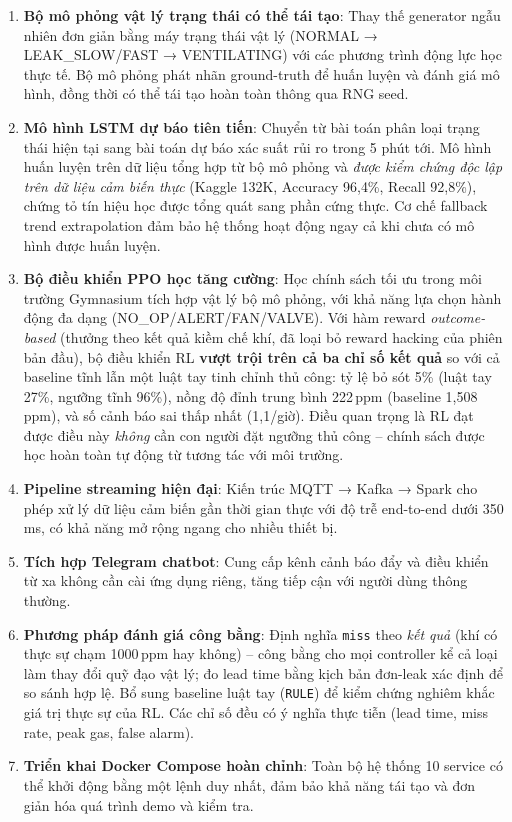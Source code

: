 \begin{enumerate}
  \item \textbf{Bộ mô phỏng vật lý trạng thái có thể tái tạo}: Thay thế generator ngẫu nhiên đơn giản bằng máy trạng thái vật lý (NORMAL → LEAK\_SLOW/FAST → VENTILATING) với các phương trình động lực học thực tế. Bộ mô phỏng phát nhãn ground-truth để huấn luyện và đánh giá mô hình, đồng thời có thể tái tạo hoàn toàn thông qua RNG seed.

  \item \textbf{Mô hình LSTM dự báo tiên tiến}: Chuyển từ bài toán phân loại trạng thái hiện tại sang bài toán dự báo xác suất rủi ro trong 5 phút tới. Mô hình huấn luyện trên dữ liệu tổng hợp từ bộ mô phỏng và \emph{được kiểm chứng độc lập trên dữ liệu cảm biến thực} (Kaggle 132K, Accuracy 96{,}4\%, Recall 92{,}8\%), chứng tỏ tín hiệu học được tổng quát sang phần cứng thực. Cơ chế fallback trend extrapolation đảm bảo hệ thống hoạt động ngay cả khi chưa có mô hình được huấn luyện.

  \item \textbf{Bộ điều khiển PPO học tăng cường}: Học chính sách tối ưu trong môi trường Gymnasium tích hợp vật lý bộ mô phỏng, với khả năng lựa chọn hành động đa dạng (NO\_OP/ALERT/FAN/VALVE). Với hàm reward \textit{outcome-based} (thưởng theo kết quả kiềm chế khí, đã loại bỏ reward hacking của phiên bản đầu), bộ điều khiển RL \textbf{vượt trội trên cả ba chỉ số kết quả} so với cả baseline tĩnh lẫn một luật tay tinh chỉnh thủ công: tỷ lệ bỏ sót 5\% (luật tay 27\%, ngưỡng tĩnh 96\%), nồng độ đỉnh trung bình 222\,ppm (baseline 1{,}508\,ppm), và số cảnh báo sai thấp nhất (1{,}1/giờ). Điều quan trọng là RL đạt được điều này \emph{không} cần con người đặt ngưỡng thủ công -- chính sách được học hoàn toàn tự động từ tương tác với môi trường.

  \item \textbf{Pipeline streaming hiện đại}: Kiến trúc MQTT → Kafka → Spark cho phép xử lý dữ liệu cảm biến gần thời gian thực với độ trễ end-to-end dưới 350 ms, có khả năng mở rộng ngang cho nhiều thiết bị.

  \item \textbf{Tích hợp Telegram chatbot}: Cung cấp kênh cảnh báo đẩy và điều khiển từ xa không cần cài ứng dụng riêng, tăng tiếp cận với người dùng thông thường.

  \item \textbf{Phương pháp đánh giá công bằng}: Định nghĩa \texttt{miss} theo \emph{kết quả} (khí có thực sự chạm 1000\,ppm hay không) -- công bằng cho mọi controller kể cả loại làm thay đổi quỹ đạo vật lý; đo lead time bằng kịch bản đơn-leak xác định để so sánh hợp lệ. Bổ sung baseline luật tay (\texttt{RULE}) để kiểm chứng nghiêm khắc giá trị thực sự của RL. Các chỉ số đều có ý nghĩa thực tiễn (lead time, miss rate, peak gas, false alarm).

  \item \textbf{Triển khai Docker Compose hoàn chỉnh}: Toàn bộ hệ thống 10 service có thể khởi động bằng một lệnh duy nhất, đảm bảo khả năng tái tạo và đơn giản hóa quá trình demo và kiểm tra.
\end{enumerate}

